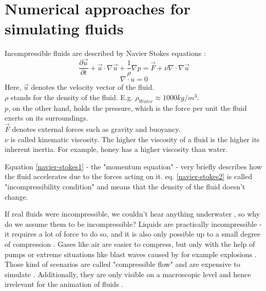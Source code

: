 \chapter{Numerical approaches for simulating fluids}\label{chapter:cudapressuresolver}

Incompressible fluids are described by Navier Stokes equations \parencite{navier1827memoire} \parencite{stokes1880theories}:\\
\begin{equation} \label{navier-stokes1}
    \frac{\partial \vec{u}}{\partial t} + \vec{u} \cdot \nabla \vec{u} + \frac{1}{\rho}  \nabla p = \vec{F} + \nu \nabla \cdot \nabla \vec{u}
\end{equation}
\begin{equation} \label{navier-stokes2}
    \nabla \cdot u = 0
\end{equation}
Here, $\vec{u}$ denotes the velocity vector of the fluid.\\
$\rho$ stands for the density of the fluid. E.g. $\rho_{Water} \approx 1000 kg/m^3$. \\
$p$, on the other hand, holds the pressure, which is the force per unit the fluid exerts on its surroundings.\\
$\vec{F}$ denotes external forces such as gravity and buoyancy.\\
$\nu$ is called kinematic viscosity. The higher the viscosity of a fluid is the higher its inherent inertia. For example, honey has a higher viscosity than water.\\
\par Equation \ref{navier-stokes1} - the "momentum equation" - very briefly describes how the fluid accelerates due to the forces acting on it. eq. \ref{navier-stokes2} is called "incompressibility condition" and means that the density of the fluid doesn't change.
\par If real fluids were incompressible, we couldn't hear anything underwater \parencite{urick1967principles}, so why do we assume them to be incompressible? Liquids are practically incompressible - it requires a lot of force to do so, and it is also only possible up to a small degree of compression \parencite{kell1975density}. Gases like air are easier to compress, but only with the help of pumps \parencite{burenga1978portable} or extreme situations like blast waves caused by for example explosions \parencite{taylor1950formation} \parencite{taylor1950formation2}. Those kind of scenarios are called "compressible flow" and are expensive to simulate \parencite{poinsot1992boundary}. Additionally, they are only visible on a macroscopic level and hence irrelevant for the animation of fluids \parencite{bridson2015fluid}.
